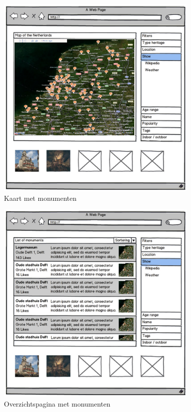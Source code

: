 \documentclass[a4paper,10pt]{article}
\begin{document}
			\begin{figure}[ht!]
				\centering
				\includegraphics[height=10cm]{interface1.png}
				\caption{Kaart met monumenten \label{interface1}}
			\end{figure}
			
			\begin{figure}[ht!]
				\centering
				\includegraphics[height=10cm]{interface2.png}
				\caption{Overzichtspagina met monumenten \label{interface2}}
			\end{figure}
			
\end{document}
